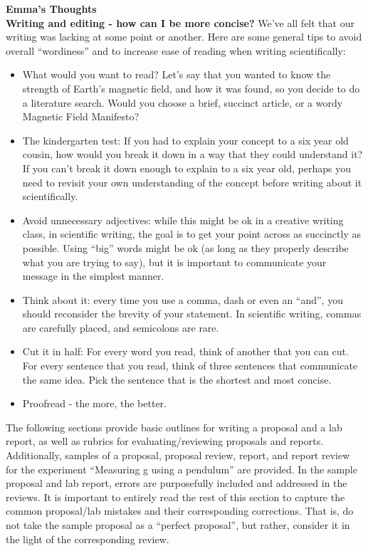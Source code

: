 \begin{framed}
\textbf{Emma's Thoughts}\\
\textbf{Writing and editing - how can I be more concise?}
We've all felt that our writing was lacking at some point or another. Here are some general tips to avoid overall ``wordiness'' and to increase ease of reading when writing scientifically:

\begin{itemize}
\item What would you want to read? Let's say that you wanted to know the strength of Earth's magnetic field, and how it was found, so you decide to do a literature search. Would you choose a brief, succinct article, or a wordy Magnetic Field Manifesto?
\item The kindergarten test: If you had to explain your concept to a six year old cousin, how would you break it down in a way that they could understand it? If you can't break it down enough to explain to a six year old, perhaps you need to revisit your own understanding of the concept before writing about it scientifically.
\item Avoid unnecessary adjectives: while this might be ok in a creative writing class, in scientific writing, the goal is to get your point across as succinctly as possible. Using ``big'' words might be ok (as long as they properly describe what you are trying to say), but it is important to communicate your message in the simplest manner.
\item Think about it: every time you use a comma, dash or even an ``and'', you should reconsider the brevity of your statement. In scientific writing, commas are carefully placed, and semicolons are rare.
\item Cut it in half: For every word you read, think of another that you can cut. For every sentence that you read, think of three sentences that communicate the same idea. Pick the sentence that is the shortest and most concise.
\item Proofread - the more, the better.
\end{itemize}
\end{framed}

The following sections provide basic outlines for writing a proposal and a lab report, as well as rubrics for evaluating/reviewing proposals and reports. Additionally, samples of a proposal, proposal review, report, and report review for the experiment ``Measuring g using a pendulum'' are provided. In the sample proposal and lab report, errors are purposefully included and addressed in the reviews. It is important to entirely read the rest of this section to capture the common proposal/lab mistakes and their corresponding corrections. That is, do not take the sample proposal as a ``perfect proposal'', but rather, consider it in the light of the corresponding review.

